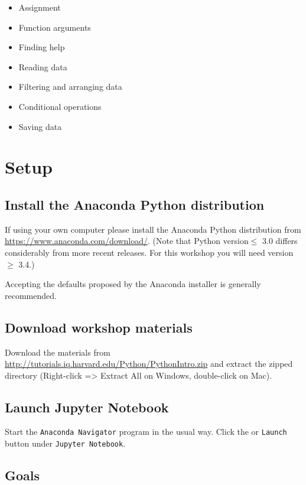 \documentclass[]{book}
\providecommand{\tightlist}{%
  \setlength{\itemsep}{0pt}\setlength{\parskip}{0pt}}
\begin{document}
\begin{itemize}
\tightlist
\item
  Assignment
\item
  Function arguments
\item
  Finding help
\item
  Reading data
\item
  Filtering and arranging data
\item
  Conditional operations
\item
  Saving data
\end{itemize}

\section{Setup}\label{setup-4}

\subsection{Install the Anaconda Python
distribution}\label{install-the-anaconda-python-distribution}

If using your own computer please install the Anaconda Python
distribution from \url{https://www.anaconda.com/download/}. (Note that
Python version\(\leq\) 3.0 differs considerably from more recent
releases. For this workshop you will need version\(\geq\) 3.4.)

Accepting the defaults proposed by the Anaconda installer is generally
recommended.

\subsection{Download workshop
materials}\label{download-workshop-materials}

Download the materials from
\url{http://tutorials.iq.harvard.edu/Python/PythonIntro.zip} and extract
the zipped directory (Right-click =\textgreater{} Extract All on
Windows, double-click on Mac).

\subsection{Launch Jupyter Notebook}\label{launch-jupyter-notebook}

Start the \texttt{Anaconda\ Navigator} program in the usual way. Click
the or \texttt{Launch} button under \texttt{Jupyter\ Notebook}.

\subsection{Goals}\label{goals-4}
\end{document}
